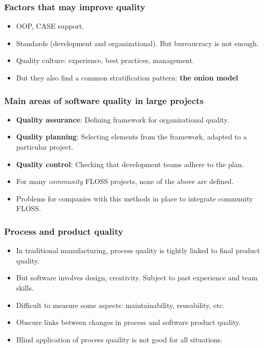 \documentclass{beamer}
\begin{document}

\begin{frame}
 \frametitle{Factors that may improve quality}
 \begin{itemize}
 \item OOP, CASE support.
 \item Standards (development and organizational). But bureaucracy is not enough.
 \item Quality culture: experience, best practices, management.
 \item But they also find a common stratification pattern:
  \textbf{the onion model}
 \end{itemize}
\end{frame}


\begin{frame}
 \frametitle{Main areas of software quality in large projects}
 \begin{itemize}
  \item \textbf{Quality assurance}: Defining framework for organizational quality.
  \item \textbf{Quality planning}: Selecting elements from the framework, adapted
  to a particular project.
  \item \textbf{Quality control}: Checking that development teams adhere to the plan.
  \item For many \textit{community} FLOSS projects, none of the above are defined.
  \item Problems for companies with this methods in place to integrate community FLOSS.
 \end{itemize}
\end{frame}


\begin{frame}
 \frametitle{Process and product quality}
 \begin{itemize}
 \item In traditional manufacturing, process quality is tightly linked to final product quality.
 \item But software involves design, creativity. Subject to past experience and team skills.
 \item Difficult to measure some aspects: maintainability, reusability, etc.
 \item Obscure links between changes in process and software product quality.
 \item Blind application of process quaility is not good for all situations.
 \end{itemize}
\end{frame}
\end{document}

